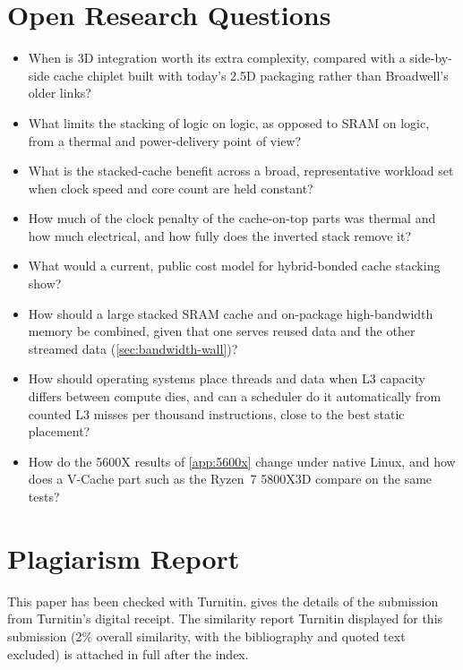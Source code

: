 \section{Open Research Questions}
\label{sec:open-questions}
\begin{itemize}
  \item When is 3D integration worth its extra complexity, compared with a side-by-side cache chiplet built with today's 2.5D packaging rather than Broadwell's older links?
  \item What limits the stacking of logic on logic, as opposed to SRAM on logic, from a thermal and power-delivery point of view?
  \item What is the stacked-cache benefit across a broad, representative workload set when clock speed and core count are held constant?
  \item How much of the clock penalty of the cache-on-top parts was thermal and how much electrical, and how fully does the inverted stack remove it?
  \item What would a current, public cost model for hybrid-bonded cache stacking show?
  \item How should a large stacked SRAM cache and on-package high-bandwidth memory be combined, given that one serves reused data and the other streamed data (\cref{sec:bandwidth-wall})?
  \item How should operating systems place threads and data when L3 capacity differs between compute dies, and can a scheduler do it automatically from counted L3 misses per thousand instructions, close to the best static placement?
  \item How do the 5600X results of \cref{app:5600x} change under native Linux, and how does a V-Cache part such as the Ryzen~7 5800X3D compare on the same tests?
\end{itemize}

\clearpage
\printbibliography[heading=bibintoc,title={References}]

\clearpage
\appendix
\section{Plagiarism Report}
\label{app:plagiarism-report}

This paper has been checked with Turnitin.  gives the details of the submission from Turnitin's digital receipt. The similarity report Turnitin displayed for this submission (2\% overall similarity, with the bibliography and quoted text excluded) is attached in full after the index.

